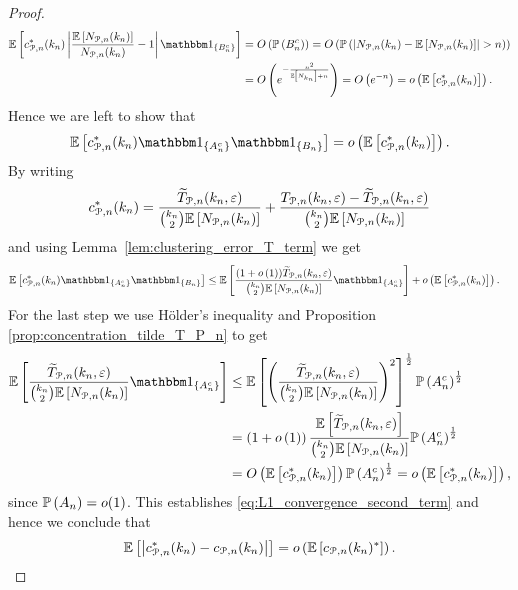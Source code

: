 \begin{proof}
\begin{align*}
	\Exp{c_{\Pcal, n}^\ast(k_n)\left|\frac{\Exp{N_{\Pcal,n}(k_n)}}{N_{\Pcal,n}(k_n)} - 1\right|\ind{B_n^c}} 
	&= \bigO{\Prob{B_n^c}}
		= \bigO{\Prob{\left|N_{\Pcal,n}(k_n) - \Exp{N_{\Pcal,n}(k_n)}\right| > n}}\\
	&= \bigO{e^{-\frac{n^2}{\Exp{N_{k_n}} + n}}} = \bigO{e^{-n}} = \smallO{\Exp{c_{\Pcal, n}^\ast(k_n)}}.
\end{align*}
Hence we are left to show that
\begin{equation}\label{eq:L1_convergence_second_term}
	\Exp{c_{\Pcal, n}^\ast(k_n)\ind{A_n^c}\ind{B_n}} = \smallO{\Exp{c_{\Pcal, n}^\ast(k_n)}}.
\end{equation}
By writing
\begin{align*}
	c_{{\mathcal P}, n}^\ast(k_n) = \frac{\widetilde{T}_{{\mathcal P},n}(k_n,\varepsilon)}{\binom{k_n}{2}\mathbb{E}\left[N_{{\mathcal P},n}(k_n)\right]}
	+ \frac{T_{{\mathcal P},n}(k_n,\varepsilon)- \widetilde{T}_{{\mathcal P},n}(k_n,\varepsilon)}{\binom{k_n}{2}\mathbb{E}\left[N_{{\mathcal P},n}(k_n)\right]}
\end{align*}
and using Lemma~\ref{lem:clustering_error_T_term} we get
\begin{align*}
	\Exp{c_{\Pcal, n}^\ast(k_n)\ind{A_n^c}\ind{B_n}}
	&\le \Exp{\frac{(1+\smallO{1})\widetilde{T}_{\Pcal,n}(k_n,\varepsilon)}{\binom{k_n}{2}\Exp{N_{\Pcal,n}(k_n)}}
		\ind{A_n^c}} + \smallO{\Exp{c_{\Pcal, n}^\ast(k_n)}}.
\end{align*}
For the last step we use H\"{o}lder's inequality and Proposition \ref{prop:concentration_tilde_T_P_n} to get
\begin{align*}
	\Exp{\frac{\widetilde{T}_{\Pcal,n}(k_n,\varepsilon)}{\binom{k_n}{2}\Exp{N_{\Pcal,n}(k_n)}}\ind{A_n^c}}
	&\le \Exp{\left(\frac{\widetilde{T}_{\Pcal,n}(k_n,\varepsilon)}
		{\binom{k_n}{2}\Exp{N_{\Pcal,n}(k_n)}}\right)^2}^{\frac{1}{2}} \Prob{A_n^c}^{\frac{1}{2}}\\
	&= \left(1 + \smallO{1}\right) 	
		\frac{\Exp{\widetilde{T}_{\Pcal,n}(k_n,\varepsilon)}}{\binom{k_n}{2}\Exp{N_{\Pcal,n}(k_n)}}
		\Prob{A_n^c}^{\frac{1}{2}}\\
	&= \bigO{\Exp{c_{\Pcal, n}^\ast(k_n)}}\Prob{A_n^c}^{\frac{1}{2}} = \smallO{\Exp{c_{\Pcal, n}^\ast(k_n)}},
\end{align*}
since $\mathbb{P}\left(A_n\right) = o(1)$. This establishes \eqref{eq:L1_convergence_second_term} and hence we conclude that
\[
	\mathbb{E}\left[\left|c_{{\mathcal P}, n}^\ast(k_n) - c_{{\mathcal P}, n}(k_n)\right|\right] = o\left(\mathbb{E}\left[c_{{\mathcal P},n}(k_n)^\ast\right]\right).
\]
\end{proof}


